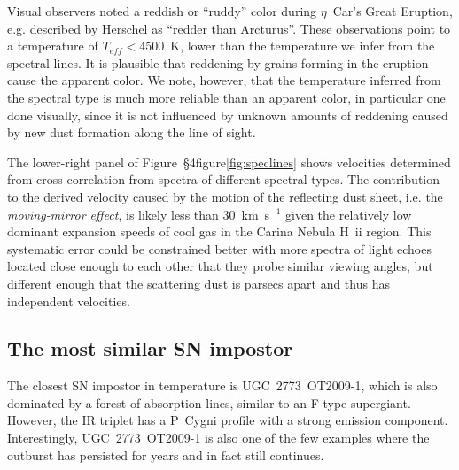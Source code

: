Visual observers noted a reddish or ``ruddy'' color during
$\eta$~Car's Great Eruption, e.g. described by Herschel as ``redder
than Arcturus''\cite{Frew04,SF11}. These observations point to a
temperature of $T_{eff}<4500$~K, lower than the temperature we infer
from the spectral lines. It is plausible that reddening by grains
forming in the eruption cause the apparent color. We note, however,
that the temperature inferred from the spectral type is much more
reliable than an apparent color, in particular one done visually,
since it is not influenced by unknown amounts of reddening caused by new
dust formation along the line of sight.



The lower-right panel of Figure~\S4figure\ref{fig:speclines} shows velocities
determined from cross-correlation from spectra of different spectral
types.  The contribution to the derived velocity caused by the motion of the
reflecting dust sheet, i.e. the \emph{moving-mirror effect}, is likely
less than 30~km~s$^{-1}$ given the relatively low dominant expansion
speeds of cool gas in the Carina Nebula H~{\sc ii}
region\cite{Walborn02}.  This systematic error could be constrained
better with more spectra of light echoes located close enough to each
other that they probe similar viewing angles, but different enough
that the scattering dust is parsecs apart and thus has independent
velocities.


\subsection{The most similar SN impostor}
The closest SN impostor in temperature is UGC~2773~OT2009-1, which is
also dominated by a forest of absorption lines, similar to an F-type
supergiant\cite{Smith10,Foley11}. However, the  IR triplet
has a P~Cygni profile with a strong emission component\cite{Foley11}.
Interestingly, UGC~2773~OT2009-1 is also one of the few examples where
the outburst has persisted for years and in fact still
continues\cite{Smith10,Smith11,Foley11}.

